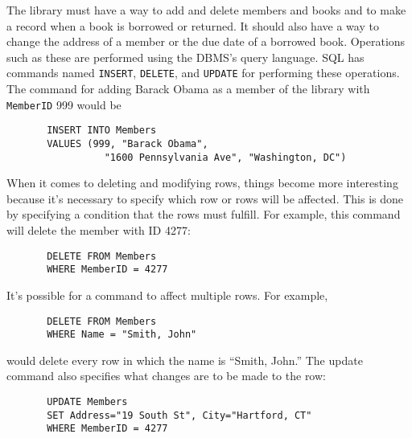 The library must have a way to add and delete members and books
and to make a record when a book is borrowed or returned.
It should also have a way to change the address of a member
or the due date of a borrowed book.  Operations such as
these are performed using the DBMS's query language.
SQL has commands named \texttt{INSERT}, \texttt{DELETE},
and \texttt{UPDATE} for performing these operations.
The command for adding Barack Obama as a member of the
library with \texttt{MemberID} 999 would be
\begin{verbatim}
       INSERT INTO Members
       VALUES (999, "Barack Obama",
                 "1600 Pennsylvania Ave", "Washington, DC")
\end{verbatim}
When it comes to deleting and modifying rows, things become
more interesting because it's necessary to specify which
row or rows will be affected.  This is done by specifying
a condition that the rows must fulfill.  For example,
this command will delete the member with ID 4277:
\begin{verbatim}
       DELETE FROM Members
       WHERE MemberID = 4277
\end{verbatim}
It's possible for a command to affect multiple rows.  For
example,
\begin{verbatim}
       DELETE FROM Members
       WHERE Name = "Smith, John"
\end{verbatim}
would delete every row in which the name is ``Smith, John.''
The update command also specifies what changes are to be
made to the row:
\begin{verbatim}
       UPDATE Members
       SET Address="19 South St", City="Hartford, CT"
       WHERE MemberID = 4277
\end{verbatim}

